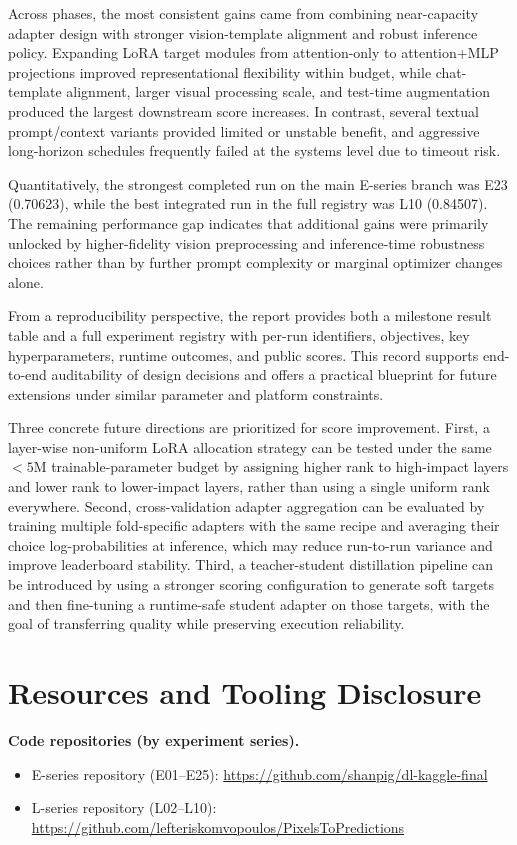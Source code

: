 \documentclass[11pt]{article}
\begin{document}
Across phases, the most consistent gains came from combining near-capacity adapter design with stronger vision-template alignment and robust inference policy. Expanding LoRA target modules from attention-only to attention+MLP projections improved representational flexibility within budget, while chat-template alignment, larger visual processing scale, and test-time augmentation produced the largest downstream score increases. In contrast, several textual prompt/context variants provided limited or unstable benefit, and aggressive long-horizon schedules frequently failed at the systems level due to timeout risk.

Quantitatively, the strongest completed run on the main E-series branch was E23 (0.70623), while the best integrated run in the full registry was L10 (0.84507). The remaining performance gap indicates that additional gains were primarily unlocked by higher-fidelity vision preprocessing and inference-time robustness choices rather than by further prompt complexity or marginal optimizer changes alone.

From a reproducibility perspective, the report provides both a milestone result table and a full experiment registry with per-run identifiers, objectives, key hyperparameters, runtime outcomes, and public scores. This record supports end-to-end auditability of design decisions and offers a practical blueprint for future extensions under similar parameter and platform constraints.

Three concrete future directions are prioritized for score improvement. First, a layer-wise non-uniform LoRA allocation strategy can be tested under the same $<5$M trainable-parameter budget by assigning higher rank to high-impact layers and lower rank to lower-impact layers, rather than using a single uniform rank everywhere. Second, cross-validation adapter aggregation can be evaluated by training multiple fold-specific adapters with the same recipe and averaging their choice log-probabilities at inference, which may reduce run-to-run variance and improve leaderboard stability. Third, a teacher-student distillation pipeline can be introduced by using a stronger scoring configuration to generate soft targets and then fine-tuning a runtime-safe student adapter on those targets, with the goal of transferring quality while preserving execution reliability.

\section*{Resources and Tooling Disclosure}
\noindent\textbf{Code repositories (by experiment series).}
\begin{itemize}
  \item E-series repository (E01--E25): \url{https://github.com/shanpig/dl-kaggle-final}
  \item L-series repository (L02--L10): \url{https://github.com/lefteriskomvopoulos/PixelsToPredictions}
\end{itemize}
\end{document}
